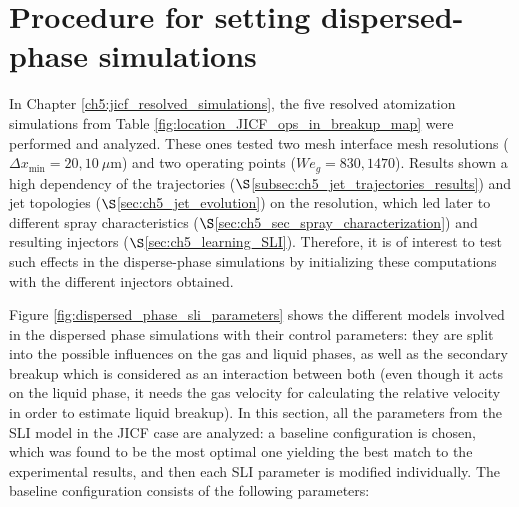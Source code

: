 \clearpage

\section{Procedure for setting dispersed-phase simulations}

In Chapter \ref{ch5:jicf_resolved_simulations}, the five resolved atomization simulations from Table \ref{fig:location_JICF_ops_in_breakup_map} were performed and analyzed. These ones tested two mesh interface mesh resolutions ($\Delta x_\mathrm{min} = 20, 10~\mu$m) and two operating points ($We_g = 830, 1470$). Results shown a high dependency of the trajectories ($\S$\ref{subsec:ch5_jet_trajectories_results}) and jet topologies ($\S$\ref{sec:ch5_jet_evolution}) on the resolution, which led later to different spray characteristics ($\S$\ref{sec:ch5_sec_spray_characterization}) and resulting injectors ($\S$\ref{sec:ch5_learning_SLI}). Therefore, it is of interest to test such effects in the disperse-phase simulations by initializing these computations with the different injectors obtained.

Figure \ref{fig:dispersed_phase_sli_parameters} shows the different models involved in the dispersed phase simulations with their control parameters: they are split into the possible influences on the gas and liquid phases, as well as the secondary breakup which is considered as an interaction between both (even though it acts on the liquid phase, it needs the gas velocity for calculating the relative velocity in order to estimate liquid breakup). In this section, all the parameters from the SLI model in the JICF case are analyzed: a baseline configuration is chosen, which was found to be the most optimal one yielding the best match to the experimental results, and then each SLI parameter is modified individually. The baseline configuration consists of the following parameters:

